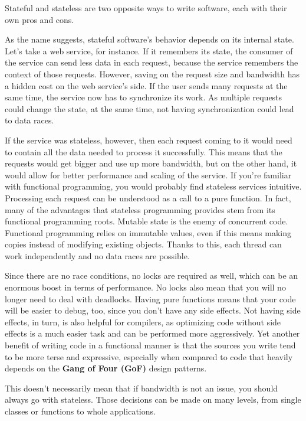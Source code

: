 
Stateful and stateless are two opposite ways to write software, each with their own pros and cons.

As the name suggests, stateful software's behavior depends on its internal state. Let's take a web service, for instance. If it remembers its state, the consumer of the service can send less data in each request, because the service remembers the context of those requests. However, saving on the request size and bandwidth has a hidden cost on the web service's side. If the user sends many requests at the same time, the service now has to synchronize its work. As multiple requests could change the state, at the same time, not having synchronization could lead to data races.

If the service was stateless, however, then each request coming to it would need to contain all the data needed to process it successfully. This means that the requests would get bigger and use up more bandwidth, but on the other hand, it would allow for better performance and scaling of the service. If you're familiar with functional programming, you would probably find stateless services intuitive. Processing each request can be understood as a call to a pure function. In fact, many of the advantages that stateless programming provides stem from its functional programming roots. Mutable state is the enemy of concurrent code. Functional programming relies on immutable values, even if this means making copies instead of modifying existing objects. Thanks to this, each thread can work independently and no data races are possible. 

Since there are no race conditions, no locks are required as well, which can be an enormous boost in terms of performance. No locks also mean that you will no longer need to deal with deadlocks. Having pure functions means that your code will be easier to debug, too, since you don't have any side effects. Not having side effects, in turn, is also helpful for compilers, as optimizing code without side effects is a much easier task and can be performed more aggressively. Yet another benefit of writing code in a functional manner is that the sources you write tend to be more terse and expressive, especially when compared to code that heavily depends on the \textbf{Gang of Four (GoF)} design patterns.

This doesn't necessarily mean that if bandwidth is not an issue, you should always go with stateless. Those decisions can be made on many levels, from single classes or functions to whole applications.

